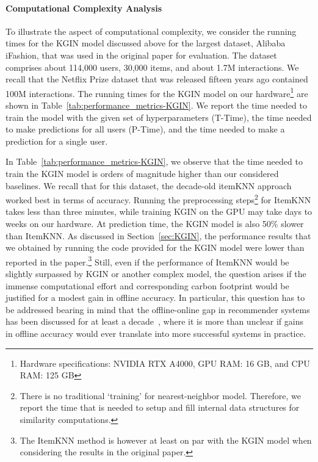 \documentclass[sigconf,natbib=true,nonacm]{acmart}
\begin{document}
\paragraph{Computational Complexity Analysis}
To illustrate the aspect of computational complexity, we consider the running times for the KGIN model discussed above for the largest dataset, Alibaba iFashion, that was used in the original paper for evaluation. The dataset comprises about 114,000 users, 30,000 items, and about 1.7M interactions. We recall that the Netflix Prize dataset that was released fifteen years ago contained 100M interactions. The running times for the KGIN model on our hardware\footnote{Hardware specifications: NVIDIA RTX A4000, GPU RAM: 16 GB, and CPU RAM: 125 GB} are shown in Table~\ref{tab:performance_metrics-KGIN}. We report the time needed to train the model with the given set of hyperparameters (T-Time), the time needed to make predictions for all users (P-Time), and the time needed to make a prediction for a single user.

In Table~\ref{tab:performance_metrics-KGIN}, we observe that the time needed to train the KGIN model is orders of magnitude higher than our considered baselines. We recall that for this dataset, the decade-old itemKNN approach worked best in terms of accuracy. Running the preprocessing steps\footnote{There is no traditional `training' for nearest-neighbor model. Therefore, we report the time that is needed to setup and fill internal data structures for similarity computations.} for ItemKNN takes less than three minutes, while training KGIN on the GPU may take days to weeks on our hardware. At prediction time, the KGIN model is also 50\% slower than ItemKNN. As discussed in Section~\ref{sec:KGIN}, the performance results that we obtained by running the code provided for the KGIN model were lower than reported in the paper.\footnote{The ItemKNN method is however at least on par with the KGIN model when considering the results in the original paper.} Still, even if the performance of ItemKNN would be slightly surpassed by KGIN or another complex model, the question arises if the immense computational effort and corresponding carbon footprint would be justified for a modest gain in offline accuracy. In particular, this question has to be addressed bearing in mind that the offline-online gap in recommender systems has been discussed for at least a decade~\cite{Levy2013PainGain}, where it is more than unclear if gains in offline accuracy would ever translate into more successful systems in practice.
\end{document}
